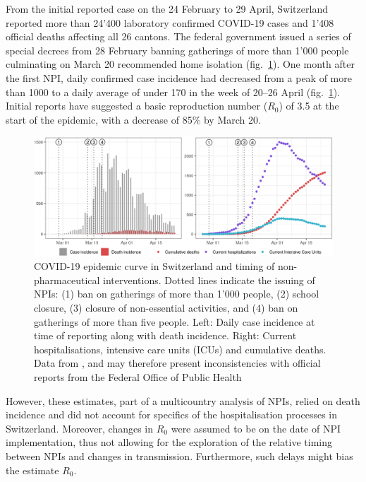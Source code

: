 From the initial reported case on the 24 February to 29 April, Switzerland reported more than 24'400 laboratory confirmed COVID-19 cases and 1'408 official deaths affecting all 26 cantons\cite{OFSP:RapportSituationEpidemiologique:2020}. The federal government issued a series of special decrees from 28 February banning gatherings of more than 1'000 people culminating on March 20 recommended home isolation (fig.~\ref{fig:covid-ch-data}). One month after the first NPI, daily confirmed case incidence had decreased from a peak of more than 1000 to a daily average of under 170 in the week of 20–26 April (fig.~\ref{fig:covid-ch-data}). Initial reports have suggested a basic reproduction number ($R_0$) of 3.5 at the start of the epidemic, with a decrease of 85\% by March 20\cite[-3\baselineskip]{Flaxman:Report13Estimating:2020}.
\begin{figure}\centering
  \includegraphics[width=\textwidth]{fig_covid-switzerland-npi/FIGURE_1.png}
  \caption[COVID-19 epidemic curve in Switzerland and timing of interventions]{COVID-19 epidemic curve in Switzerland and timing of non-pharmaceutical interventions. Dotted lines indicate the issuing of NPIs: (1) ban on gatherings of more than 1'000 people, (2) school closure, (3) closure of non-essential activities, and (4) ban on gatherings of more than five people. Left: Daily case incidence at time of reporting along with death incidence. Right: Current hospitalisations, intensive care units (ICUs) and cumulative deaths. Data from \textcite{Probst:DaenuprobstCovid19casesswitzerland:2020}, and may therefore present inconsistencies with official reports from the Federal Office of Public Health%
  }
  \label{fig:covid-ch-data}
\end{figure}
 However, these estimates, part of a multicountry analysis of NPIs, relied on death incidence and did not account for specifics of the hospitalisation processes in Switzerland. Moreover, changes in $R_0$ were assumed to be on the date of NPI implementation, thus not allowing for the exploration of the relative timing between NPIs and changes in transmission. Furthermore, such delays might bias the estimate $R_0$. 

